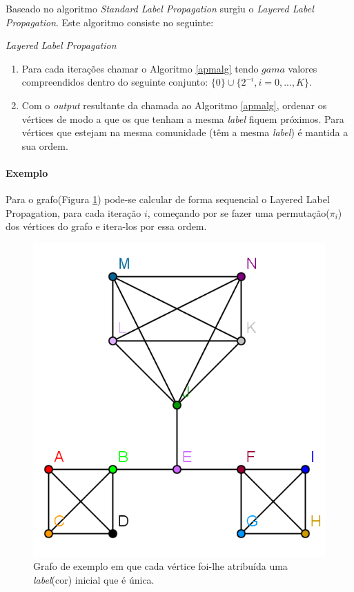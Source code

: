 \documentclass[a4paper,10pt]{report}
\begin{document}
  Baseado no algoritmo \textit{Standard Label Propagation} surgiu o \textit{Layered Label Propagation}. Este algoritmo consiste no seguinte:
  
  \begin{algorithm}
    \caption{\textit{Layered Label Propagation}}\label{llpalg}
    \begin{enumerate}
    \item Para cada iterações chamar o Algoritmo \ref{apmalg} tendo $gama$ valores compreendidos dentro do seguinte conjunto: $\{0\}\cup\{2^{{-}i},i=0,...,K\} $.
    \item Com o \textit{output} resultante da chamada ao Algoritmo \ref{apmalg}, ordenar os vértices de modo a que os que tenham a mesma \textit{label} fiquem próximos. Para vértices que estejam na mesma comunidade (têm a mesma \textit{label}) é mantida a sua ordem.
    \end{enumerate} 
  \end{algorithm}
  
  \paragraph{Exemplo} Para o grafo(Figura \ref{graph0llp}) pode-se calcular de forma sequencial o Layered Label Propagation, para cada iteração $i$, começando por se fazer uma permutação($\pi_i$) dos vértices do grafo e itera-los por essa ordem. 
  
  \begin{figure}[H]
    \center
    \includegraphics{graph_step0.png}
    \caption{Grafo de exemplo em que cada vértice foi-lhe atribuída uma \textit{label}(cor) inicial que é única.}
    \label{graph0llp}
  \end{figure}
  
\end{document}
